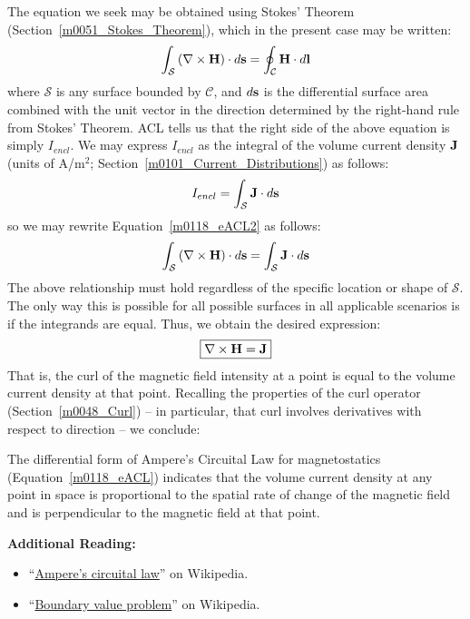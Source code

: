 The equation we seek may be obtained using Stokes' Theorem (Section~\ref{m0051_Stokes_Theorem}), which in the present case may be written:
%
\begin{equation}   
\int_{\mathcal S} \left( \nabla \times {\bf H} \right) \cdot d{\bf s} = \oint_{\mathcal C} {\bf H}\cdot d{\bf l}
\label{m0118_eACL2}
\end{equation}
%
where ${\mathcal S}$ is any surface bounded by ${\mathcal C}$, and $d{\bf s}$ is the differential surface area combined with the unit vector in the direction determined by the right-hand rule from Stokes' Theorem.
ACL tells us that the right side of the above equation is simply $I_{encl}$.
We may express $I_{encl}$ as the integral of the volume current density ${\bf J}$ (units of A/m$^2$; Section~\ref{m0101_Current_Distributions}) as follows:
%
\begin{equation}
I_{encl} = \int_{\mathcal S} {\bf J} \cdot d{\bf s}
\end{equation}
%
so we may rewrite Equation~\ref{m0118_eACL2} as follows:
%
\begin{equation}   
\int_{\mathcal S} \left( \nabla \times {\bf H} \right) \cdot d{\bf s} = \int_{\mathcal S} {\bf J} \cdot d{\bf s}
\end{equation}
%
The above relationship must hold regardless of the specific location or shape of ${\mathcal S}$.  The only way this is possible for all possible surfaces in all applicable scenarios is if the integrands are equal.  Thus, we obtain the desired expression:
%
\begin{equation}
\boxed{
\nabla \times {\bf H} = {\bf J}
}
\label{m0118_eACL}
\end{equation}
%
That is, the curl of the magnetic field intensity at a point is equal to the volume current density at that point.  
Recalling the properties of the curl operator (Section~\ref{m0048_Curl}) -- in particular, that curl involves derivatives with respect to direction -- we conclude:
%
\begin{mdframed}[backgroundcolor=yellow!20,nobreak=true] 
The differential form of Ampere's Circuital Law for magnetostatics (Equation~\ref{m0118_eACL}) indicates that the volume current density at any point in space is proportional to the spatial rate of change of the magnetic field and is perpendicular to the magnetic field at that point.
\end{mdframed}


{\bf Additional Reading:}
\begin{itemize}
\item ``\href{https://en.wikipedia.org/wiki/Ampere's_circuital_law}{Ampere's circuital law}'' on Wikipedia.
\item ``\href{https://en.wikipedia.org/wiki/Boundary_value_problem}{Boundary value problem}'' on Wikipedia.
\end{itemize}



